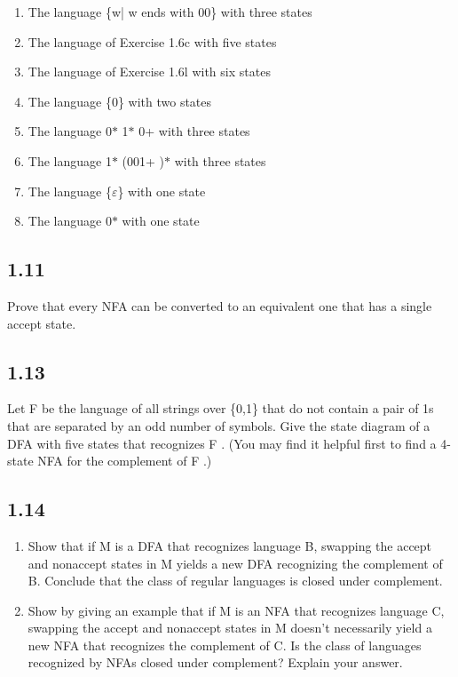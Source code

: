 \begin{enumerate}[label=(\alph*), leftmargin=2.5em]

\item The language \{w| w ends with 00\} with three states

\item The language of Exercise 1.6c with five states

\item The language of Exercise 1.6l with six states

\item The language \{0\} with two states

\item The language 0$\ast$ 1$\ast$ 0+ with three states

\item The language 1$\ast$ (001+ )$\ast$ with three states

\item The language \{$\varepsilon$\} with one state

\item The language 0$\ast$ with one state

\end{enumerate}


\subsection*{1.11}

Prove that every NFA can be converted to an equivalent one that has a single accept state.


\subsection*{1.13}

Let F be the language of all strings over \{0,1\} that do not contain a pair of 1s that are separated by an odd number of symbols. Give the state diagram of a DFA with five states that recognizes F . (You may find it helpful first to find a 4-state NFA for the complement of F .)


\subsection*{1.14}

\begin{enumerate}[label=(\alph*), leftmargin=2.5em]

\item Show that if M is a DFA that recognizes language B, swapping the accept and nonaccept states in M yields a new DFA recognizing the complement of B. Conclude that the class of regular languages is closed under complement.

\item Show by giving an example that if M is an NFA that recognizes language C, swapping the accept and nonaccept states in M doesn't necessarily yield a new NFA that recognizes the complement of C. Is the class of languages recognized by NFAs closed under complement? Explain your answer.

\end{enumerate}


